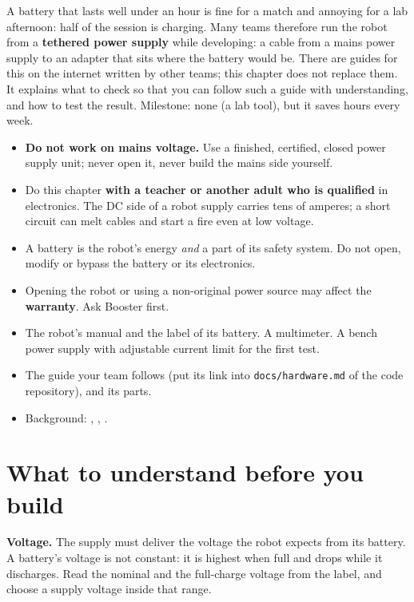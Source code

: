 \label{k:power}

A battery that lasts well under an hour is fine for a match and annoying for a lab afternoon: half of the session is charging. Many teams therefore run the robot from a \textbf{tethered power supply} while developing: a cable from a mains power supply to an adapter that sits where the battery would be. There are guides for this on the internet written by other teams; this chapter does not replace them. It explains what to check so that you can follow such a guide with understanding, and how to test the result. Milestone: none (a lab tool), but it saves hours every week.

\begin{safetybox}
\begin{itemize}[nosep]
  \item \textbf{Do not work on mains voltage.} Use a finished, certified, closed power supply unit; never open it, never build the mains side yourself.
  \item Do this chapter \textbf{with a teacher or another adult who is qualified} in electronics. The DC side of a robot supply carries tens of amperes; a short circuit can melt cables and start a fire even at low voltage.
  \item A battery is the robot's energy \emph{and} a part of its safety system. Do not open, modify or bypass the battery or its electronics.
  \item Opening the robot or using a non-original power source may affect the \textbf{warranty}. Ask Booster first\guess.
\end{itemize}
\end{safetybox}

\begin{needbox}
\begin{itemize}[nosep]
  \item The robot's manual and the label of its battery. A multimeter. A bench power supply with adjustable current limit for the first test.
  \item The guide your team follows (put its link into \texttt{docs/hardware.md} of the code repository), and its parts.
  \item Background: , , .
\end{itemize}
\end{needbox}

\section*{What to understand before you build}
\textbf{Voltage.} The supply must deliver the voltage the robot expects from its battery. A battery's voltage is not constant: it is highest when full and drops while it discharges. Read the nominal and the full-charge voltage from the label\guess, and choose a supply voltage inside that range.

